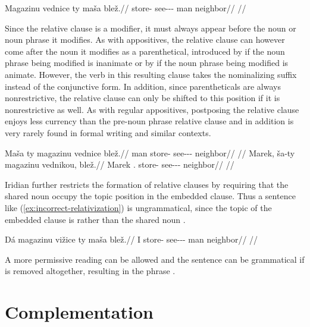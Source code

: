 \a\begingl
  \gla Magazinu vednice ty maša blež.//
  \glb store-\Ins{} see-\Pv{}-\Pf{}-\Cnj{} \Rel{} man neighbor//
  \glft {}//
\endgl
\xe

Since the relative clause is a modifier, it must always appear before the noun
or noun phrase it modifies. As with appositives, the relative clause can however
come after the noun it modifies as a parenthetical, introduced by  if
the noun phrase being modified is inanimate or by  if the noun phrase
being modified is animate. However, the verb in this resulting clause takes the
nominalizing suffix  instead of the conjunctive form. In addition,
since parentheticals are always nonrestrictive, the relative clause can only be
shifted to this position if it is nonrestrictive as well. As with regular
appositives, postposing the relative clause enjoys less currency than the
pre-noun phrase relative clause and in addition is very rarely found in formal
writing and similar contexts.

\pex
\a\begingl
  \gla \ljudge{*}Maša ty magazinu vednice blež.//
  \glb man \Rel{} store-\Ins{} see-\Pv{}-\Pf{}-\Cnj{} neighbor//
  \glft {}//
\endgl
\a\begingl
  \gla Marek, ša-ty magazinu vednikou, blež.//
  \glb Marek \Anim{}.\Rel{} store-\Ins{} see-\Pv{}-\Pf{}-\Nz{} neighbor//
  \glft {}//
\endgl
\xe

Iridian further restricts the formation of relative clauses by requiring that
the shared noun occupy the topic position in the embedded clause. Thus  a
sentence like (\ref{ex:incorrect-relativization}) is ungrammatical, since the
topic of the embedded clause is  rather than the shared noun
.

\pex\label{ex:incorrect-relativization}
\begingl
  \gla \ljudge{*}Dá magazinu vižice ty maša blež.//
  \glb I store-\Ins{} see-\Av{}-\Pf{}-\Cnj{} \Rel{} man neighbor//
  \glft {}//
\endgl
\xe

A more permissive reading can be allowed and the sentence can be grammatical if
 is removed altogether, resulting in the phrase .

\section{Complementation}\label{sec:complementation}

